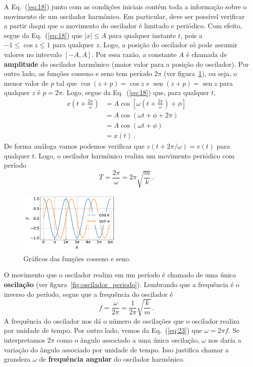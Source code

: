 \documentclass[twocolumn=on,fontsize=12pt,DIV=calc]{scrartcl}
\newcommand{\dpar}[1]{\left(#1\right)}
\newcommand{\dsqr}[1]{\left[#1\right]}
\theoremstyle{definition}
\DeclareMathOperator{\sen}{sen}
\begin{document}
A Eq.~(\ref{eq:18}) junto com as condições iniciais contêm toda a
informação sobre o movimento de um oscilador harmônico. Em particular,
deve ser possível verificar a partir daqui que o movimento do
oscilador é limitado e periódico. Com efeito, segue da
Eq.~(\ref{eq:18}) que $|x|\le A$ para qualquer instante $t$, pois a
$-1\le \cos z\le 1$ para qualquer $z$. Logo, a posição do oscilador só
pode assumir valores no intervalo $[-A,A]$. Por essa razão, a
constante $A$ é chamada de \textbf{amplitude} do oscilador harmônico
(maior valor para a posição do oscilador). Por outro lado, as funções
cosseno e seno tem período $2\pi$ (ver figura~\ref{fig:senocosseno}),
ou seja, o menor valor de $p$ tal que $\cos(z+p)=\cos z$ e
$\sen(z+p)=\sen z$ para qualquer $z$ é $p=2\pi$. Logo, segue da
Eq.~(\ref{eq:18}) que, para qualquer $t$,
\begin{equation*}
  \begin{split}
    x\dpar{t+\frac{2\pi}{\omega}}&=A\cos\dsqr{\omega\dpar{t+\frac{2\pi}{\omega}}+\phi}\\
    &=A\cos(\omega t+\phi+2\pi)\\
    &=A\cos(\omega t+\phi)\\
    &=x(t)\,.
  \end{split}
\end{equation*}
De forma análoga vamos podemos verificar que $v(t+2\pi/\omega)=v(t)$
para qualquer $t$. Logo, o oscilador harmônico realiza um movimento
periódico com período
\begin{equation}
  \label{eq:22}
  T=\frac{2\pi}{\omega}=2\pi\sqrt{\frac{m}{k}}\,.
\end{equation}
\begin{figure}[ht]
  \centering
  \includegraphics[width=0.45\textwidth,keepaspectratio]{aux/senocosseno.pdf}
  \caption{Gráficos das funções cosseno e seno.}
  \label{fig:senocosseno}
\end{figure}

O movimento que o oscilador realiza em um período é chamado de uma
única \textbf{oscilação} (ver
figura~\ref{fig:oscilador_periodo}). Lembrando que a frequência é o
inverso do período, segue que a frequência do oscilador é
\begin{equation}
  \label{eq:23}
  f=\frac{\omega}{2\pi}=\frac{1}{2\pi}\sqrt{\frac{k}{m}}\,.
\end{equation}
A frequência do oscilador nos dá o número de oscilações que o
oscilador realiza por unidade de tempo. Por outro lado, vemos da
Eq.~(\ref{eq:23}) que $\omega=2\pi f$. Se interpretamos $2\pi$ como o
ângulo associado a uma única oscilação, $\omega$ nos daria a variação
do ângulo associado por unidade de tempo. Isso justifica chamar a
grandeza $\omega$ de \textbf{frequência angular} do oscilador
harmônico.
\end{document}
